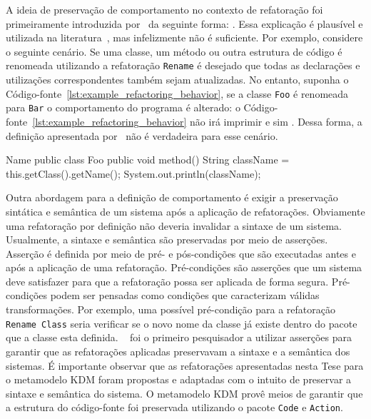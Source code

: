 A ideia de preservação de comportamento no contexto de refatoração foi primeiramente introduzida por~ da seguinte forma: . Essa explicação é plausível e utilizada na literatura~\cite{Roberts_1999, Fowler1999}, mas infelizmente não é suficiente. Por exemplo, considere o seguinte cenário. Se uma classe, um método ou outra estrutura de código é renomeada utilizando a refatoração \texttt{Rename} é desejado que todas as  declarações e utilizações correspondentes também sejam atualizadas. No entanto, suponha o Código-fonte~\ref{lst:example_refactoring_behavior}, se a classe \texttt{Foo} é renomeada para \texttt{Bar} o comportamento do programa é alterado: o Código-fonte~\ref{lst:example_refactoring_behavior} não irá imprimir  e sim . Dessa forma, a definição apresentada por~ não é verdadeira para esse cenário.   

\begin{codigo}[caption={[Um simples programa ilustrando porque é errado acreditar que refatoração não muda a saída de um programa.] Simples exemplo do efeito de uma refatoração.},escapeinside={(*@}{@*)}, basicstyle=\footnotesize, language=java, label={lst:example_refactoring_behavior}]{Name}
	public class Foo {
	    public void method(){
	        String className = this.getClass().getName();
	        System.out.println(className);
	    }
	}
\end{codigo}

Outra abordagem para a definição de comportamento é exigir a preservação sintática e semântica de um sistema após a aplicação de refatorações. Obviamente uma refatoração por definição não deveria invalidar a sintaxe de um sistema. Usualmente, a sintaxe e semântica são preservadas por meio de asserções. Asserção é definida por meio de pré- e pós-condições que são executadas antes e após a aplicação de uma refatoração. Pré-condições são asserções que um sistema deve satisfazer para que a refatoração possa ser aplicada de forma segura. Pré-condições podem ser pensadas como condições que caracterizam válidas transformações. Por exemplo, uma possível pré-condição para a refatoração \texttt{Rename Class} seria verificar se o novo nome da classe já existe dentro do pacote que a classe esta definida. ~ foi o primeiro pesquisador a utilizar asserções para garantir que as refatorações aplicadas preservavam a sintaxe e a semântica dos sistemas. É importante observar que as  refatorações apresentadas nesta Tese para o metamodelo KDM foram propostas e adaptadas com o intuito de preservar a sintaxe e semântica do sistema. O metamodelo KDM provê meios de garantir que a estrutura do código-fonte foi preservada utilizando o pacote \texttt{Code} e \texttt{Action}.


